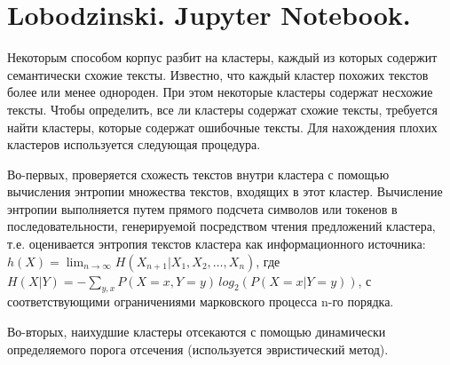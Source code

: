 \section{Lobodzinski. Jupyter Notebook.}

Некоторым способом корпус разбит на кластеры, каждый из которых содержит семантически схожие тексты. Известно, что каждый кластер похожих текстов более или менее однороден. При этом некоторые кластеры содержат несхожие тексты. Чтобы определить, все ли кластеры содержат схожие тексты, требуется найти кластеры, которые содержат ошибочные тексты. Для нахождения плохих кластеров используется следующая процедура. 

Во-первых, проверяется схожесть текстов внутри кластера с помощью вычисления энтропии множества текстов, входящих в этот кластер. Вычисление энтропии выполняется путем прямого подсчета символов или токенов в последовательности, генерируемой посредством чтения предложений кластера, т.е. оценивается энтропия текстов кластера как информационного источника: $h(X) = \lim_{n \to \infty}H(X_{n+1}|X_1, X_2, \ldots, X_n)$, где $H(X|Y) = -\sum_{y,x}P(X = x, Y = y)
\,log_2(P(X = x | Y = y))$, с соответствующими ограничениями марковского процесса n-го порядка.

Во-вторых, наихудшие кластеры отсекаются с помощью динамически определяемого порога отсечения (используется эвристический метод).